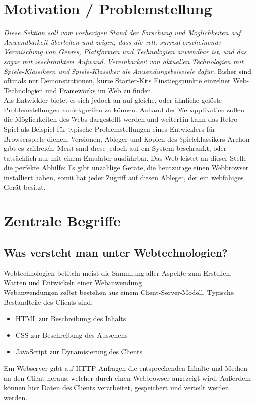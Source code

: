 \section{Motivation / Problemstellung}
\label{sec:motivation}
\emph{ Diese Sektion soll vom vorherigen Stand der Forschung und Möglichkeiten auf Anwendbarkeit überleiten und zeigen, dass die evtl. surreal erscheinende Vermischung von Genres, Plattformen und Technologien anwendbar ist, und das sogar mit beschränktem Aufwand. Vereinbarkeit von aktuellen Technologien mit Spiele-Klassikern und Spiele-Klassiker als Anwendungsbeispiele dafür.}
Bisher sind oftmals nur Demonstrationen, kurze Starter-Kits \bzw Einstiegspunkte einzelner Web-Technologien und Frameworks im Web zu finden.\\
Als Entwickler bietet es sich jedoch an auf gleiche, oder ähnliche gelöste Problemstellungen zurückgreifen zu können.
Anhand der Webapplikation sollen die Möglichkeiten des Webs dargestellt werden und weiterhin kann das Retro-Spiel als Beispiel für typische Problemstellungen eines Entwicklers für Browserspiele dienen.
Versionen, Ableger und Kopien des Spieleklassikers Archon gibt es zahlreich. Meist sind diese jedoch auf ein System beschränkt, oder tatsächlich nur mit einem Emulator ausführbar. Das Web leistet an dieser Stelle die perfekte Abhilfe: Es gibt unzählige Geräte, die heutzutage einen Webbrowser installiert haben, somit hat jeder Zugriff auf diesen Ableger, der ein webfähiges Gerät besitzt.

\section{Zentrale Begriffe}
\label{sec:zentrale_begriffe}

\subsection{Was versteht man unter Webtechnologien?}
Webtechnologien betiteln meist die Sammlung aller Aspekte zum Erstellen, Warten und Entwickeln einer Webanwendung.\\
Webanwendungen selbst bestehen aus einem Client-Server-Modell.
Typische Bestandteile des Clients sind: 
\begin{itemize}
	\item HTML zur Beschreibung des Inhalts
	\item CSS zur Beschreibung des Aussehens
	\item JavaScript zur Dynamisierung des Clients
\end{itemize}
Ein Webserver gibt auf HTTP-Anfragen die entsprechenden Inhalte und Medien an den Client heraus, welcher durch einen Webbrowser angezeigt wird. Außerdem können hier Daten des Clients verarbeitet, gespeichert und verteilt werden werden.
